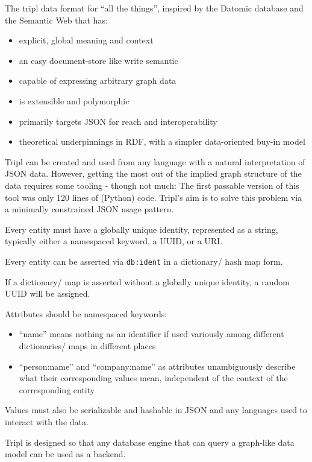 The tripl data format for ``all the things'', inspired by the Datomic database and the Semantic Web that has:

\begin{itemize}
    \item explicit, global meaning and context
    \item an easy document-store like write semantic
    \item capable of expressing arbitrary graph data
    \item is extensible and polymorphic
    \item primarily targets JSON for reach and interoperability
    \item theoretical underpinnings in RDF, with a simpler data-oriented buy-in model
\end{itemize}

Tripl can be created and used from any language with a natural interpretation of JSON data. However, getting the most out of the implied graph structure of the data requires some tooling - though not much: The first passable version of this tool was only 120 lines of (Python) code. Tripl's aim is to solve this problem via a minimally constrained JSON usage pattern.

Every entity must have a globally unique identity, represented as a string, typically either a namespaced keyword, a UUID, or a URI.

Every entity can be asserted via \colorbox{red-very-light}{\lstinline{db:ident}} in a dictionary/ hash map form.

If a dictionary/ map is asserted without a globally unique identity, a random UUID will be assigned.

Attributes should be namespaced keywords:

\begin{itemize}
    \item ``name'' means nothing as an identifier if used variously among different dictionaries/ maps in different places
    \item ``person:name'' and ``company:name'' as attributes unambiguously describe what their corresponding values mean, independent of the context of the corresponding entity
\end{itemize}

Values must also be serializable and hashable in JSON and any languages used to interact with the data.

Tripl is designed so that any database engine that can query a graph-like data model can be used as a backend.
